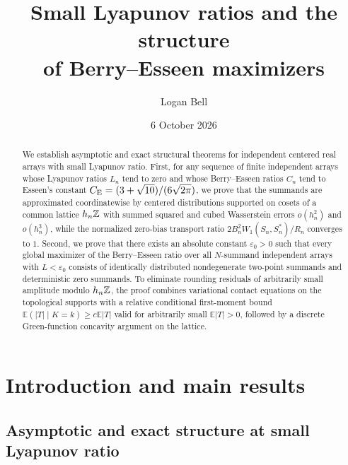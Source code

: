 \documentclass[11pt]{article}
\title{Small Lyapunov ratios and the structure\\of Berry--Esseen maximizers}
\author{Logan Bell}\date{6 October 2026}
\numberwithin{equation}{section}
\theoremstyle{remark}\newtheorem{remark}[theorem]{Remark}
\newcommand{\E}{\mathbb E}\newcommand{\Pp}{\mathbb P}
\begin{document}
\maketitle
\begin{abstract}
We establish asymptotic and exact structural theorems for independent
centered real arrays with small Lyapunov ratio. First, for any sequence of
finite independent arrays whose Lyapunov ratios $L_n$ tend to zero and whose
Berry--Esseen ratios $C_n$ tend to Esseen's constant
$C_{\mathrm E}=(3+\sqrt{10})/(6\sqrt{2\pi})$, we prove that the summands are
approximated coordinatewise by centered distributions supported on cosets of
a common lattice $h_n\mathbb Z$ with summed squared and cubed Wasserstein errors
$o(h_n^2)$ and $o(h_n^3)$, while the normalized zero-bias transport ratio
$2B_n^2W_1(S_n,S_n^*)/R_n$ converges to $1$. Second, we prove that there
exists an absolute constant $\varepsilon_0>0$ such that every global
maximizer of the Berry--Esseen ratio over all $N$-summand independent arrays
with $L<\varepsilon_0$ consists of identically distributed nondegenerate
two-point summands and deterministic zero summands. To eliminate rounding
residuals of arbitrarily small amplitude modulo $h_n\mathbb Z$, the proof combines
variational contact equations on the topological supports with a relative
conditional first-moment bound $\E(|T|\mid K=k)\ge c\E|T|$ valid for
arbitrarily small $\E|T|>0$, followed by a discrete Green-function concavity
argument on the lattice.
\end{abstract}
\tableofcontents

\section{Introduction and main results}

\subsection{Asymptotic and exact structure at small Lyapunov ratio}
\end{document}
